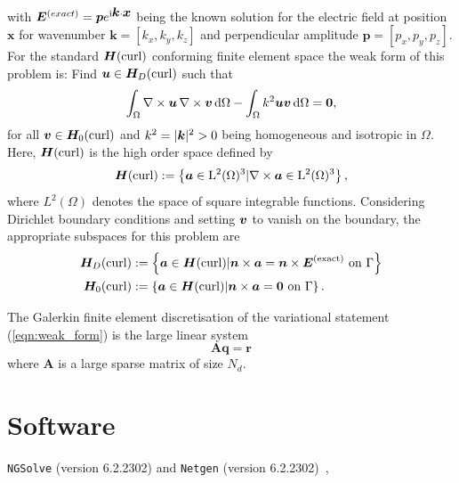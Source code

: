 \documentclass[a4paper,12]{elsarticle}
\theoremstyle{definition}
\renewcommand{\vec}[1]{\mbox{\boldmath$#1$}}
\newcommand{\curl}{\nabla \times}
\begin{document}
with $\boldsymbol{E}^{(exact)} = \vec{p}e^{\rm{i} \vec{k} \cdot \vec{x}}$ being the known solution for the electric field at position $\boldsymbol{x}$ for wavenumber $\boldsymbol{k} = \left[k_x, k_y, k_z\right]$ and perpendicular amplitude $\boldsymbol{p} = \left[p_x, p_y, p_z\right]$. For the standard $\boldsymbol{H}(\rm{curl})$ conforming finite element space \cite{Monk2017} the weak form of this problem is: Find $\boldsymbol{u} \in \boldsymbol{H}_D(\rm{curl})$ such that
\begin{equation}\label{eqn:weak_form}
\int_\Omega \curl \vec{u} \, \curl \vec{v} \,\mathrm{d}\Omega - \int_\Omega k^2 \vec{u}\vec{v} \,\mathrm{d}\Omega = \vec{0},
\end{equation}
for all $\vec{v} \in \boldsymbol{H}_0(\rm{curl})$ and $k^2 = |\vec{k}|^2 > 0$ being homogeneous and isotropic in $\Omega$. Here, $\boldsymbol{H}(\rm{curl})$ is the high order space defined by
\begin{equation*}
\boldsymbol{H}(\rm{curl}) := \left\{ \vec{a} \in L^2(\Omega)^3 | \curl \vec{a} \in L^2(\Omega)^3\right\},
\end{equation*}
where $L^2(\Omega)$ denotes the space of square integrable functions. Considering Dirichlet boundary conditions and setting $\vec{v}$ to vanish on the boundary, the appropriate subspaces for this problem are
\begin{equation*}
\begin{alignedat}{2}
\boldsymbol{H}_D(\rm{curl}) &:= \left\{ \vec{a} \in \vec{H}(\rm{curl}) | \vec{n}\times \vec{a} = \vec{n} \times \vec{E}^{(exact)} \text{ on } \Gamma\right\}\\
\boldsymbol{H}_0(\rm{curl}) &:= \left\{ \vec{a} \in \vec{H}(\rm{curl}) | \vec{n}\times \vec{a} = \vec{0} \text{ on } \Gamma\right\}.
\end{alignedat}
\end{equation*}

The Galerkin finite element discretisation of the variational statement (\ref{eqn:weak_form}) is the large linear system
\begin{equation}
\mathbf{A}\mathbf{q} = \mathbf{r}
\end{equation}
where $\mathbf{A}$ is a large sparse matrix of size $N_d$.
\section{Software}
\texttt{NGSolve} (version 6.2.2302) and \texttt{Netgen} (version 6.2.2302)~\cite{NGSolve,zaglmayrphd,netgendet}, 
\end{document}
